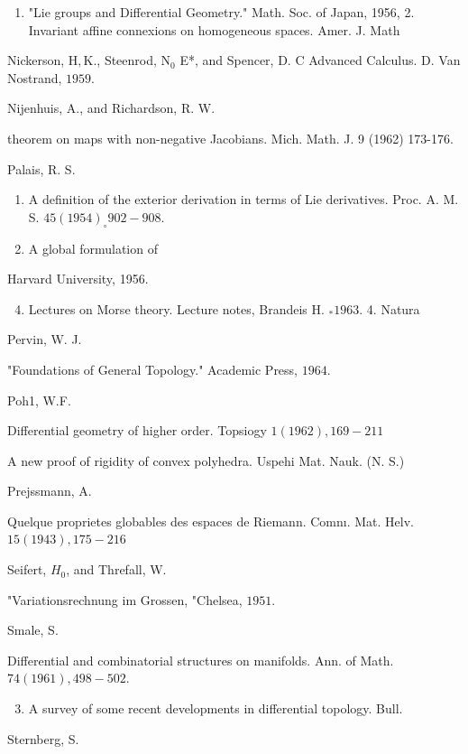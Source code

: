 \documentclass[10pt]{article}
\begin{document}
\begin{enumerate}
  \item "Lie groups and Differential Geometry." Math. Soc. of Japan, 1956, 2. Invariant affine connexions on homogeneous spaces. Amer. J. Math
\end{enumerate}
Nickerson, $\mathrm{H}, \mathrm{K} .$, Steenrod, $\mathrm{N}_{0}$ E*, and Spencer, D. C Advanced Calculus. D. Van Nostrand, $1959 .$

Nijenhuis, A., and Richardson, R. W.

theorem on maps with non-negative Jacobians. Mich. Math. J. 9 (1962) 173-176.

Palais, R. S.

\begin{enumerate}
  \item A definition of the exterior derivation in terms of Lie derivatives. Proc. A. M. S. $45(1954)_{\circ} 902-908 .$

  \item A global formulation of

\end{enumerate}
Harvard University, 1956.

\begin{enumerate}
  \setcounter{enumi}{3}
  \item Lectures on Morse theory. Lecture notes, Brandeis H. $_{*} 1963 .$ 4. Natura
\end{enumerate}
Pervin, W. J.

"Foundations of General Topology." Academic Press, $1964 .$

Poh1, W.F.

Differential geometry of higher order. Topsiogy $1(1962), 169-211$

A new proof of rigidity of convex polyhedra. Uspehi Mat. Nauk. (N. S.)

Prejssmann, A.

Quelque proprietes globables des espaces de Riemann. Comnı. Mat. Helv. $15(1943), 175-216$

Seifert, $H_{0}$, and Threfall, W.

"Variationsrechnung im Grossen, "Chelsea, $1951 .$

Smale, S.

Differential and combinatorial structures on manifolds. Ann. of Math. $74(1961), 498-502 .$

\begin{enumerate}
  \setcounter{enumi}{2}
  \item A survey of some recent developments in differential topology. Bull.
\end{enumerate}
Sternberg, S.
\end{document}
